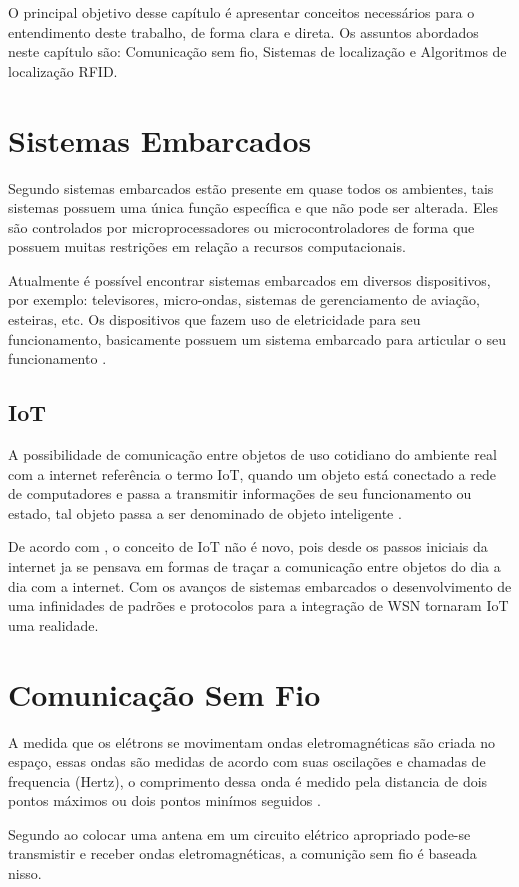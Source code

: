 \label{chapter:conceitos}
O principal objetivo desse capítulo é apresentar conceitos necessários para o entendimento deste trabalho, de forma clara e direta. Os assuntos abordados neste capítulo são: Comunicação sem fio, Sistemas de localização e Algoritmos de localização RFID.
\section{Sistemas Embarcados}
    \par
    Segundo \citeauthor{rodrigo2016} sistemas embarcados estão presente em quase todos os ambientes, tais sistemas possuem uma única função específica e que não pode ser alterada. Eles são controlados por microprocessadores ou microcontroladores de forma que possuem muitas restrições em relação a recursos computacionais.

    \par
    Atualmente é possível encontrar sistemas embarcados em diversos dispositivos, por exemplo: televisores, micro-ondas, sistemas de gerenciamento de aviação, esteiras, etc. Os dispositivos que fazem uso de eletricidade para seu funcionamento, basicamente possuem um sistema embarcado para articular o seu funcionamento \cite{rodrigo2016}.
    
    \subsection{IoT}
    \par
    A possibilidade de comunicação entre objetos de uso cotidiano do ambiente real com a internet referência o termo IoT, quando um objeto está conectado a rede de computadores e passa a transmitir informações de seu funcionamento ou estado, tal objeto passa a ser denominado de objeto inteligente \cite{iot2016}.
    \par
    De acordo com \citeauthor{iot2017}, o conceito de IoT não é novo, pois desde os passos iniciais da internet ja se pensava em formas de traçar a comunicação entre objetos do dia a dia com a internet. Com os avanços de sistemas embarcados o desenvolvimento de uma infinidades de padrões e protocolos para a integração de WSN tornaram IoT uma realidade.
\section{Comunicação Sem Fio}
    \par
    A medida que os elétrons se movimentam ondas eletromagnéticas são criada no espaço, essas ondas são medidas de acordo com suas oscilações e chamadas de frequencia (Hertz), o comprimento dessa onda é medido pela distancia de dois pontos máximos ou dois pontos minímos seguidos \cite{tenenbaum2002}.
    \par
    Segundo \citeauthor{tenenbaum2002} ao colocar uma antena em um circuito elétrico apropriado pode-se  transmistir e receber ondas eletromagnéticas, a comunição sem fio é baseada nisso.
    
